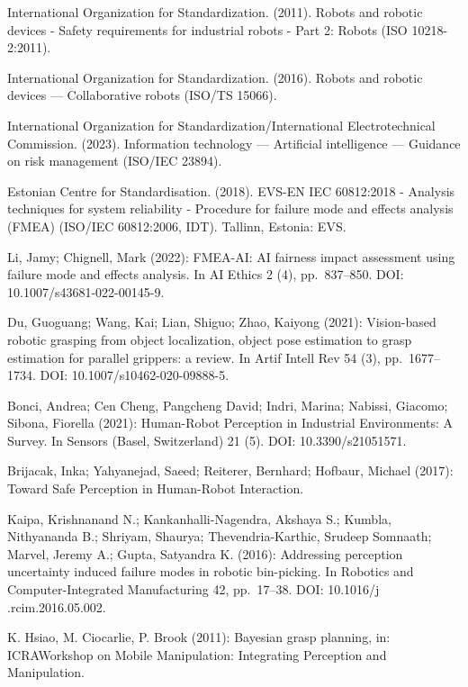 \begin{thebibliography}{99}
International Organization for Standardization. (2011). Robots and robotic devices - Safety requirements for industrial robots - Part 2: Robots (ISO 10218-2:2011). 

 International Organization for Standardization. (2016). Robots and robotic devices — Collaborative robots (ISO/TS 15066).

 International Organization for Standardization/International Electrotechnical Commission. (2023). Information technology — Artificial intelligence — Guidance on risk management (ISO/IEC 23894).

 Estonian Centre for Standardisation. (2018). EVS-EN IEC 60812:2018 - Analysis techniques for system reliability - Procedure for failure mode and effects analysis (FMEA) (ISO/IEC 60812:2006, IDT). Tallinn, Estonia: EVS.

 Li, Jamy; Chignell, Mark (2022): FMEA-AI: AI fairness impact assessment using failure mode and effects analysis. In AI Ethics 2 (4), pp. 837–850. DOI: 10.1007/s43681-022-00145-9.


  Du, Guoguang; Wang, Kai; Lian, Shiguo; Zhao, Kaiyong (2021): Vision-based robotic grasping from object localization, object pose estimation to grasp estimation for parallel grippers: a review. In Artif Intell Rev 54 (3), pp. 1677–1734. DOI: 10.1007/s10462-020-09888-5.

 Bonci, Andrea; Cen Cheng, Pangcheng David; Indri, Marina; Nabissi, Giacomo; Sibona, Fiorella (2021): Human-Robot Perception in Industrial Environments: A Survey. In Sensors (Basel, Switzerland) 21 (5). DOI: 10.3390/s21051571.

 Brijacak, Inka; Yahyanejad, Saeed; Reiterer, Bernhard; Hofbaur, Michael (2017): Toward Safe Perception in Human-Robot Interaction.

 Kaipa, Krishnanand N.; Kankanhalli-Nagendra, Akshaya S.; Kumbla, Nithyananda B.; Shriyam, Shaurya; Thevendria-Karthic, Srudeep Somnaath; Marvel, Jeremy A.; Gupta, Satyandra K. (2016): Addressing perception uncertainty induced failure modes in robotic bin-picking. In Robotics and Computer-Integrated Manufacturing 42, pp. 17–38. DOI: 10.1016/j                .rcim.2016.05.002.

 K. Hsiao, M. Ciocarlie, P. Brook (2011): Bayesian grasp planning, in: ICRAWorkshop on Mobile Manipulation: Integrating Perception and Manipulation.


\end{thebibliography}
